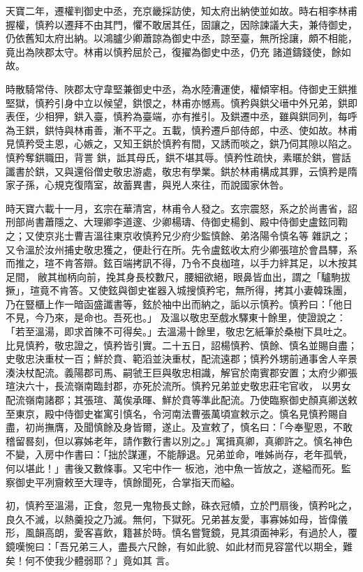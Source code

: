 \begin{pinyinscope}
 天寶二年，遷權判御史中丞，充京畿採訪使，知太府出納使並如故。時右相李林甫握權，慎矜以遷拜不由其門，懼不敢居其任，固讓之，因除諫議大夫，兼侍御史，仍依舊知太府出納。以鴻臚少卿蕭諒為御史中丞，諒至臺，無所捴讓，頗不相能，竟出為陜郡太守。林甫以慎矜屈於己，復擢為御史中丞，仍充
 諸道鑄錢使，餘如故。



 時散騎常侍、陜郡太守韋堅兼御史中丞，為水陸漕運使，權傾宰相。侍御史王鉷推堅獄，慎矜引身中立以候望，鉷恨之，林甫亦憾焉。慎矜與鉷父瑨中外兄弟，鉷即表侄，少相狎，鉷入臺，慎矜為臺端，亦有推引。及鉷遷中丞，雖與鉷同列，每呼為王鉷，鉷恃與林甫善，漸不平之。五載，慎矜遷戶部侍郎，中丞、使如故。林甫見慎矜受主恩，心嫉之，又知王鉷於慎矜有間，又誘而啖之，鉷乃伺其隙以陷之。慎矜奪鉷職田，背詈
 鉷，詆其母氏，鉷不堪其辱。慎矜性疏快，素暱於鉷，嘗話讖書於鉷，又與還俗僧史敬忠游處，敬忠有學業。鉷於林甫構成其罪，云慎矜是隋家子孫，心規克復隋室，故蓄異書，與兇人來往，而說國家休咎。



 時天寶六載十一月，玄宗在華清宮，林甫令人發之。玄宗震怒，系之於尚書省，詔刑部尚書蕭隱之、大理卿李道邃、少卿楊璹、侍御史楊釗、殿中侍御史盧鉉同鞫之；又使京兆士曹吉溫往東京收慎矜兄少府少監慎餘、弟洛陽令慎名等
 雜訊之；又令溫於汝州捕史敬忠獲之，便赴行在所。先令盧鉉收太府少卿張瑄於會昌驛，系而推之，瑄不肯答辯。鉉百端拷訊不得，乃令不良枷瑄，以手力絆其足，以木按其足間，敝其枷柄向前，挽其身長校數尺，腰細欲絕，眼鼻皆血出，謂之「驢駒拔撅」，瑄竟不肯答。又使鉉與御史崔器入城搜慎矜宅，無所得，拷其小妻韓珠團，乃在豎櫃上作一暗函盛讖書等，鉉於袖中出而納之，詬以示慎矜。慎矜曰：「他日不見，今乃來，是命也。吾死也。」
 及溫以敬忠至戲水驛東十餘里，使證說之：「若至溫湯，即求首陳不可得矣。」去溫湯十餘里，敬忠乞紙筆於桑樹下具吐之。比見慎矜，敬忠證之，慎矜皆引實。二十五日，詔楊慎矜、慎餘、慎名並賜自盡；史敬忠決重杖一百；鮮於賁、範滔並決重杖，配流遠郡；慎矜外甥前通事舍人辛景湊決杖配流。義陽郡司馬、嗣虢王巨與敬忠相識，解官於南賓郡安置；太府少卿張瑄決六十，長流嶺南臨封郡，亦死於流所。慎矜兄弟並史敬忠莊宅官收，
 以男女配流嶺南諸郡；其張瑄、萬俟承暉、鮮於賁等準此配流。乃使臨察御史顏真卿送敕至東京，殿中侍御史崔寓引慎名，令河南法曹張萬頃宣敕示之。慎名見慎矜賜自盡，初尚撫膺，及聞慎餘及身皆爾，遂止。及宣敕了，慎名曰：「今奉聖恩，不敢稽留晷刻，但以寡姊老年，請作數行書以別之。」寓揖真卿，真卿許之。慎名神色不變，入房中作書曰：「拙於謀運，不能靜退。兄弟並命，唯姊尚存，老年孤煢，何以堪此！」書後又數條事。又宅中作一
 板池，池中魚一皆放之，遂縊而死。監察御史平冽齎敕至大理寺，慎餘聞死，合掌指天而縊。



 初，慎矜至溫湯，正食，忽見一鬼物長丈餘，硃衣冠幘，立於門扇後，慎矜叱之，良久不滅，以熱羹投之乃滅。無何，下獄死。兄弟甚友愛，事寡姊如母，皆偉儀形，風韻高朗，愛客喜飲，籍甚於時。慎名嘗覽鏡，見其須面神彩，有過於人，覆鏡嘆惋曰：「吾兄弟三人，盡長六尺餘，有如此貌、如此材而見容當代以期全，難矣！何不使我少體弱耶？」竟如其
 言。




\end{pinyinscope}
